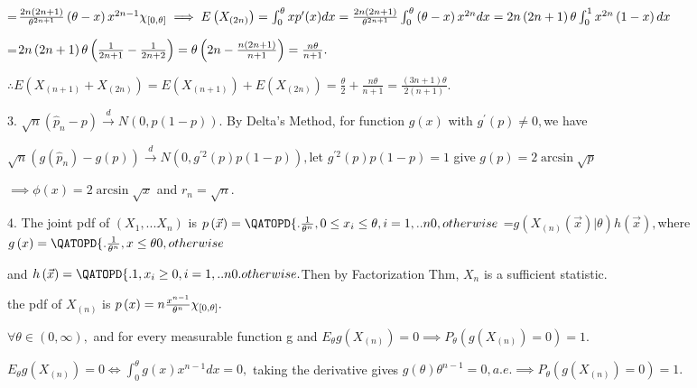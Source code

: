 \documentclass{ctexart}
\begin{document}
=$\frac{2n\left( 2n+1\right) }{\theta ^{2n+1}}\left( \theta -x\right)
x^{2n-1}\chi _{\lbrack 0,\theta ]}\implies E\left( X_{\left( 2n\right)
}\right) =\int_{0}^{\theta }xp^{\prime }(x)dx=\frac{2n\left( 2n+1\right) }{%
\theta ^{2n+1}}\int_{0}^{\theta }\left( \theta -x\right) x^{2n}dx=2n\left(
2n+1\right) \theta \int_{0}^{1}x^{2n}\left( 1-x\right) dx$

=$2n\left( 2n+1\right) \theta \left( \frac{1}{2n+1}-\frac{1}{2n+2}\right)
=\theta \left( 2n-\frac{n\left( 2n+1\right) }{n+1}\right) =\allowbreak \frac{%
n\theta }{n+1}.$

$\therefore E\left( X_{\left( n+1\right) }+X_{\left( 2n\right) }\right)
=E\left( X_{\left( n+1\right) }\right) +E\left( X_{\left( 2n\right) }\right)
=\frac{\theta }{2}+\allowbreak \frac{n\theta }{n+1}=\frac{\left( 3n+1\right)
\theta }{2\left( n+1\right) }.$

3. $\sqrt{n}\left( \hat{p}_{n}-p\right) \overset{d}{\rightarrow }N\left(
0,p\left( 1-p\right) \right) .$ By Delta's Method, for function $g\left(
x\right) $ with $g^{\prime }\left( p\right) \neq 0,$we have

$\sqrt{n}\left( g\left( \hat{p}_{n}\right) -g\left( p\right) \right) \overset%
{d}{\rightarrow }N\left( 0,g^{\prime 2}\left( p\right) p\left( 1-p\right)
\right) ,$let $g^{\prime 2}\left( p\right) p\left( 1-p\right) =1$ give $%
g\left( p\right) =2\arcsin \sqrt{p}$

$\implies \phi \left( x\right) =2\arcsin \sqrt{x}$ and $r_{n}=\sqrt{n}.$

4. The joint pdf of $\left( X_{1},...X_{n}\right) $ is $p\left( \vec{x}%
\right) =\QATOPD\{ . {\frac{1}{\theta ^{n}},0\leq x_{i}\leq \theta
,i=1,..n}{0,otherwise}$ =$g\left( X_{\left( n\right) }\left( \vec{x}\right)
|\theta \right) h\left( \vec{x}\right) ,$where $g\left( x\right) =\QATOPD\{
. {\frac{1}{\theta ^{n}},x\leq \theta }{0,otherwise}$

and $h\left( \vec{x}\right) =\QATOPD\{ . {1,x_{i}\geq
0,i=1,..n}{0.otherwise}.$Then by Factorization Thm, $X_{n}$ is a sufficient
statistic.

the pdf of $X_{\left( n\right) }$ is $p\left( x\right) =n\frac{x^{n-1}}{%
\theta ^{n}}\chi _{\lbrack 0,\theta ]}.$

$\forall \theta \in \left( 0,\infty \right) ,$ and for every measurable
function g and $E_{\theta }g\left( X_{\left( n\right) }\right) =0\implies
P_{\theta }\left( g\left( X_{\left( n\right) }\right) =0\right) =1.$

$E_{\theta }g\left( X_{\left( n\right) }\right) =0\iff \int_{0}^{\theta
}g\left( x\right) x^{n-1}dx=0,$ taking the derivative gives $g\left( \theta
\right) \theta ^{n-1}=0,a.e.\implies P_{\theta }\left( g\left( X_{\left(
n\right) }\right) =0\right) =1.$
\end{document}
